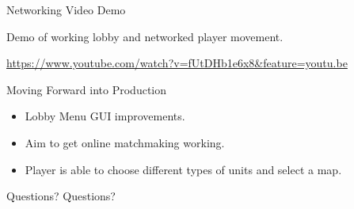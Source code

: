 \documentclass{beamer}
\begin{document}
\begin{frame}{Networking Video Demo}
	\begin{center}
	Demo of working lobby and networked player movement.
	\par
		\url{https://www.youtube.com/watch?v=fUtDHb1e6x8&feature=youtu.be}
	\end{center}
\end{frame}

\begin{frame}{Moving Forward into Production}
	\begin{itemize}
		\item Lobby Menu GUI improvements. \pause
		\item Aim to get online matchmaking working. \pause
		\item Player is able to choose different types of units and select a map.
	\end{itemize}
\end{frame}
\begin{frame}{Questions?}
Questions?
\end{frame}
\end{document}
